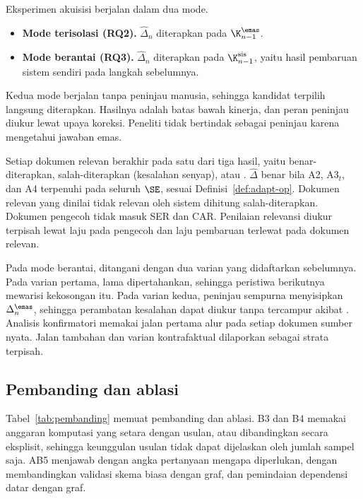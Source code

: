 Eksperimen akuisisi berjalan dalam dua mode.
\begin{itemize}[leftmargin=*,nosep]
  \item \textbf{Mode terisolasi (RQ2).} $\hat{\Delta}_n$ diterapkan pada $\K^{\emas}_{n-1}$.
  \item \textbf{Mode berantai (RQ3).} $\hat{\Delta}_n$ diterapkan pada $\K^{\mathrm{sis}}_{n-1}$, yaitu hasil pembaruan sistem sendiri pada langkah sebelumnya.
\end{itemize}
Kedua mode berjalan tanpa peninjau manusia, sehingga kandidat terpilih langsung diterapkan. Hasilnya adalah batas bawah kinerja, dan peran peninjau diukur lewat upaya koreksi. Peneliti tidak bertindak sebagai peninjau karena mengetahui jawaban emas.

Setiap dokumen relevan berakhir pada satu dari tiga hasil, yaitu benar-diterapkan, salah-diterapkan (kesalahan senyap), atau . $\hat{\Delta}$ benar bila A2, A3$_t$, dan A4 terpenuhi pada seluruh $\SE$, sesuai Definisi~\ref{def:adapt-op}. Dokumen relevan yang dinilai tidak relevan oleh sistem dihitung salah-diterapkan. Dokumen pengecoh tidak masuk SER dan CAR. Penilaian relevansi diukur terpisah lewat laju  pada pengecoh dan laju pembaruan terlewat pada dokumen relevan.

Pada mode berantai,  ditangani dengan dua varian yang didaftarkan sebelumnya. Pada varian pertama,  lama dipertahankan, sehingga peristiwa berikutnya mewarisi kekosongan itu. Pada varian kedua, peninjau sempurna menyisipkan $\Delta^{\emas}_n$, sehingga perambatan kesalahan dapat diukur tanpa tercampur akibat . Analisis konfirmatori memakai jalan pertama alur pada setiap dokumen sumber nyata. Jalan tambahan dan varian kontrafaktual dilaporkan sebagai strata terpisah.

\subsection{Pembanding dan ablasi}
\label{subsec:pembanding}

Tabel~\ref{tab:pembanding} memuat pembanding dan ablasi. B3 dan B4 memakai anggaran komputasi yang setara dengan usulan, atau dibandingkan secara eksplisit, sehingga keunggulan usulan tidak dapat dijelaskan oleh jumlah sampel saja. AB5 menjawab dengan angka pertanyaan mengapa  diperlukan, dengan membandingkan validasi skema biasa dengan  graf, dan pemindaian dependensi datar dengan  graf.

